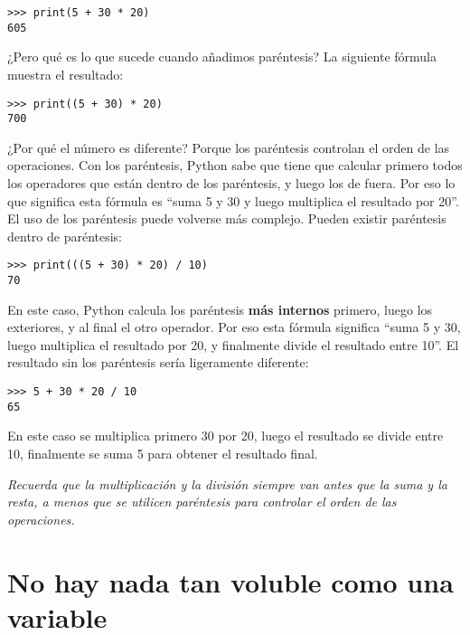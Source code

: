 \begin{listing}
\begin{verbatim}
>>> print(5 + 30 * 20)
605
\end{verbatim}
\end{listing}

\noindent
¿Pero qué es lo que sucede cuando añadimos paréntesis? La siguiente fórmula muestra el resultado:

\begin{listing}
\begin{verbatim}
>>> print((5 + 30) * 20)
700
\end{verbatim}
\end{listing}

\noindent
¿Por qué el número es diferente? Porque los paréntesis controlan el orden de las operaciones. Con los paréntesis, Python sabe que tiene que calcular primero todos los operadores que están dentro de los paréntesis, y luego los de fuera. Por eso lo que significa esta fórmula es ``suma 5 y 30 y luego multiplica el resultado por 20''.
El uso de los paréntesis puede volverse más complejo. Pueden existir paréntesis dentro de paréntesis:

\begin{listing}
\begin{verbatim}
>>> print(((5 + 30) * 20) / 10)
70
\end{verbatim}
\end{listing}

\noindent
En este caso, Python calcula los paréntesis \textbf{más internos} primero, luego los exteriores, y al final el otro operador. Por eso esta fórmula significa ``suma 5 y 30, luego multiplica el resultado por 20, y finalmente divide el resultado entre 10''. El resultado sin los paréntesis sería ligeramente diferente:

\begin{listing}
\begin{verbatim}
>>> 5 + 30 * 20 / 10
65
\end{verbatim}
\end{listing}

En este caso se multiplica primero 30 por 20, luego el resultado se divide entre 10, finalmente se suma 5 para obtener el resultado final.

\emph{Recuerda que la multiplicación y la división siempre van antes que la suma y la resta, a menos que se utilicen paréntesis para controlar el orden de las operaciones.}

\section{No hay nada tan voluble como una variable}

